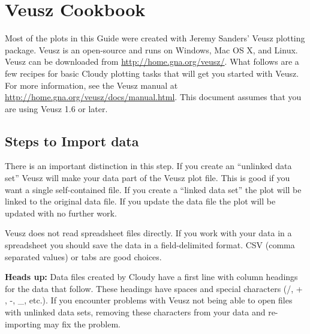 
%





\section{Veusz Cookbook}
\label{sec:VeuszCookbook}

Most of the plots in this Guide were created with Jeremy Sanders' Veusz plotting package.
Veusz is an open-source and runs on Windows, Mac OS X,
and Linux. Veusz can be downloaded from \url{http://home.gna.org/veusz/}. What follows are a few recipes for basic Cloudy plotting tasks that will get you started with Veusz. For more information, see the Veusz manual at \url{http://home.gna.org/veusz/docs/manual.html}. This document assumes that you 
are using Veusz 1.6 or later.

\subsection{Steps to Import data}

There is an important distinction in this step.
If you create an ``unlinked data set'' Veusz will make your data part of the
Veusz plot file. 
This is good if you want a single self-contained file.
If you create a ``linked data set'' the plot will be linked to the original
data file.  If you update the data file the plot will be updated with no further work.

Veusz does not read spreadsheet files directly.
If you work with your data in a spreadsheet you should save the
data in a field-delimited format.
CSV (comma separated values) or tabs are good choices.

\textbf{Heads up:} Data files created by Cloudy have a first line with 
column headings for the data that follow. These headings have spaces and 
special characters (/, + , -, {\_}, etc.). If you encounter problems with 
Veusz not being able to open files with unlinked data sets, removing 
these characters from your data and re-importing may fix the problem.


